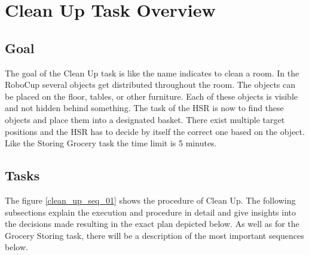 \documentclass[main.tex]{subfiles}
\begin{document}
	\begingroup

	\renewcommand{\cleardoublepage}{}

	\renewcommand{\clearpage}{}

	\chapter{Clean Up Task Overview}
	\label{cleanup-sequence}

		
		\section{Goal}
		The goal of the Clean Up task is like the name indicates to clean a room. In the RoboCup several objects get distributed throughout the room. The objects can be placed on the floor, tables, or other furniture. Each of these objects is visible and not hidden behind something. The task of the HSR is now to find these objects and place them into a designated basket. There exist multiple target positions and the HSR has to decide by itself the correct one based on the object. Like the Storing Grocery task the time limit is 5 minutes.

	  	\section{Tasks}
	  	The figure \ref{clean_up_seq_01} shows the procedure of Clean Up. The following subsections explain the execution and procedure in detail and give insights into the decisions made resulting in the exact plan depicted below. As well as for the Grocery Storing task, there will be a description of the most important sequences below.
\end{document}
